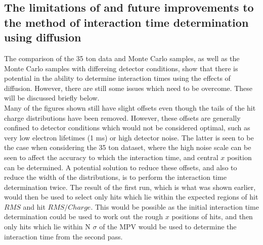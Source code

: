 \subsection{The limitations of and future improvements to the method of interaction time determination using diffusion} \label{sec:DiffLimitations}
The comparison of the 35 ton data and Monte Carlo samples, as well as the Monte Carlo samples with differeing detector conditions, show that there is potential in the ability to determine interaction times using the effects of diffusion. However, there are still some issues which need to be overcome. These will be discussed briefly below. \\

Many of the figures shown still have slight offsets even though the tails of the hit charge distributions have been removed. However, these offsets are generally confined to detector conditions which would not be considered optimal, such as very low electron lifetimes (1 ms) or high detector noise. The latter is seen to be the case when considering the 35 ton dataset, where the high noise scale can be seen to affect the accuracy to which the interaction time, and central $x$ position can be determined. A potential solution to reduce these offsets, and also to reduce the width of the distributions, is to perform the interaction time determination twice. The result of the first run, which is what was shown earlier, would then be used to select only hits which lie within the expected regions of hit $RMS$ and hit $RMS/Charge$. This would be possible as the initial interaction time determination could be used to work out the rough $x$ positions of hits, and then only hits which lie within N $\sigma$ of the MPV would be used to determine the interaction time from the second pass. \\

